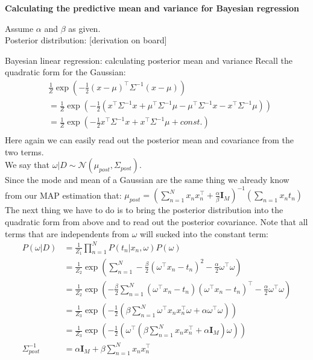 \textbf{Calculating the predictive mean and variance for Bayesian regression}

Assume $\alpha$ and $\beta$ as given.\\ Posterior distribution: [derivation on board]

\begin{bbbox}{Bayesian linear regression: calculating posterior mean and variance}
	Recall the quadratic form for the Gaussian: \\
	\begin{align*}
		&\frac{1}{Z} \exp \left( -\frac{1}{2} \left( x-\mu \right)^{\top} \Sigma^{-1} \left( x-\mu \right) \right) \\
		           &= \frac{1}{Z} \exp \left( -\frac{1}{2} \left( x^{\top}\Sigma^{-1}x + \mu^{\top}\Sigma^{-1}\mu 
		             - \mu^{\top}\Sigma^{-1}x - x^{\top}\Sigma^{-1}\mu \right) \right)\\
		           &= \frac{1}{Z} \exp \left( -\frac{1}{2} x^{\top}\Sigma^{-1}x + x^{\top}\Sigma^{-1}\mu + const. \right) \\
	\end{align*}
	Here again we can easily read out the posterior mean and covariance from the two terms. \\
	We say that $\omega | D \sim \mathcal{N}\left( \mu_{post}, \Sigma_{post}\right)$. \\
	Since the mode and mean of a Gaussian are the same thing we already know from our MAP estimation that:
	$ \mu_{post} = \left( \sum_{n=1}^N x_n x_n^{\top} + \frac{\alpha}{\beta} \mathbf{I}_M \right)^{-1} \left( \sum_{n=1} x_n t_n \right)$ \\
	The next thing we have to do is to bring the posterior  distribution into the quadratic form from above and to read out the posterior covariance. Note that all terms that are independents from $\omega$ will sucked into the constant term: \\
	\begin{align*}
		P(\omega|D) &= \frac{1}{Z_1} \prod_{n=1}^N P(t_n|x_n,\omega) P(\omega) \\
		&= \frac{1}{Z_2} \exp \left( \sum_{n=1}^N -\frac{\beta}{2} \left( \omega^{\top} x_n - t_n \right) ^2 - \frac{\alpha}{2} \omega^{\top} \omega \right) \\
		&= \frac{1}{Z_2} \exp \left( -\frac{\beta}{2} \sum_{n=1}^N \left( \omega^{\top} x_n - t_n \right) \left( \omega^{\top} x_n - t_n \right)^{\top} - \frac{\alpha}{2} \omega^{\top} \omega \right) \\
		&= \frac{1}{Z_3} \exp \left( -\frac{1}{2} \left( \beta \sum_{n=1}^N \omega^{\top} x_n x_n^{\top} \omega + \alpha \omega^{\top} \omega \right) \right) \\
		&= \frac{1}{Z_3} \exp \left( -\frac{1}{2} \left( \omega^{\top} \left( \beta \sum_{n=1}^N x_n x_n^{\top} + \alpha \mathbf{I}_M \right) \omega \right) \right) \\
		\Sigma_{post}^{-1}&=\alpha \mathbf{I}_M + \beta \sum_{n=1}^N x_n x_n^\top\\
	\end{align*}
\end{bbbox}

